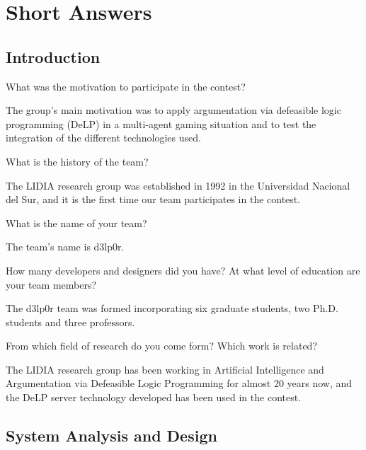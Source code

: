 
\section{Short Answers}


\subsection{Introduction}

\begin{question}
What was the motivation to participate in the contest?  
\end{question}

The group's main motivation was to apply argumentation via defeasible logic
programming (DeLP) in a multi-agent gaming situation and to test the integration
of the different technologies used.

\begin{question}
What is the history of the team?  
\end{question}

The LIDIA research group was established in 1992 in the Universidad Nacional del
Sur, and it is the first time our team participates in the contest.

\begin{question}
What is the name of your team?  
\end{question}

The team's name is d3lp0r.

\begin{question}
How many developers and designers did you have?  At what level of education are
your team members?  
\end{question}

The d3lp0r team was formed incorporating six graduate students, two Ph.D.
students and three professors.

\begin{question}
From which field of research do you come form?  Which work is related?  
\end{question}

The LIDIA research group has been working in Artificial Intelligence and
Argumentation via Defeasible Logic Programming for almost 20 years now, and the
DeLP server technology developed has been used in the contest.

\subsection{System Analysis and Design}
\setcounter{question}{0}

